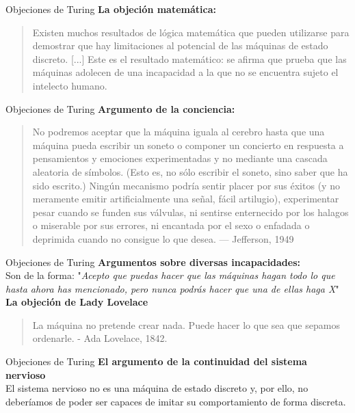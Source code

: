 \documentclass{beamer}
\begin{document}
\begin{frame}{Objeciones de Turing}
\textbf{La objeción matemática:}
\begin{quote}\small Existen muchos resultados de lógica matemática que pueden utilizarse para demostrar que hay limitaciones al potencial de las máquinas de estado discreto. [...] Este es el resultado matemático: se afirma que prueba que las máquinas adolecen de una incapacidad a la que no se encuentra sujeto el intelecto humano.\end{quote}
\end{frame}
\begin{frame}{Objeciones de Turing}
\textbf{Argumento de la conciencia:}
\begin{quote}\small No podremos aceptar que la máquina iguala al cerebro hasta que una máquina pueda escribir un soneto o componer un concierto en respuesta a pensamientos y emociones experimentadas y no mediante una cascada aleatoria de símbolos. (Esto es, no sólo escribir el soneto, sino saber que ha sido escrito.) Ningún mecanismo podría sentir placer por sus éxitos (y no meramente emitir artificialmente una señal, fácil artilugio), experimentar pesar cuando se funden sus válvulas, ni sentirse enternecido por los halagos o miserable por sus errores, ni encantada por el sexo o enfadada o deprimida cuando no consigue lo que desea. — Jefferson, 1949\end{quote}

\end{frame}
\begin{frame}{Objeciones de Turing}
\textbf{Argumentos sobre diversas incapacidades:}\\
Son de la forma: "\emph{Acepto que puedas hacer que las máquinas hagan todo lo que hasta ahora has mencionado, pero nunca podrás hacer que una de ellas haga X}"\\
\vspace{8mm}
\textbf{La objeción de Lady Lovelace}
\begin{quote}\small La máquina no pretende crear nada. Puede hacer lo que sea que sepamos ordenarle. - Ada Lovelace, 1842.\end{quote}
\end{frame}

\begin{frame}{Objeciones de Turing}
\textbf{El argumento de la continuidad del sistema nervioso}\\
El sistema nervioso no es una máquina de estado discreto y, por ello, no deberíamos de poder ser capaces de imitar su comportamiento de forma discreta.

\end{frame}
\end{document}

